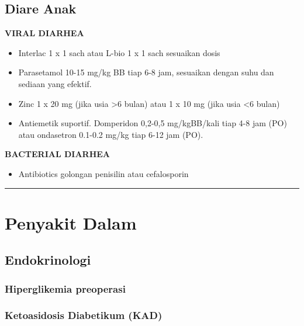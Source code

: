 \documentclass[
]{book}
\providecommand{\tightlist}{%
  \setlength{\itemsep}{0pt}\setlength{\parskip}{0pt}}
\begin{document}
\hypertarget{diare-anak}{%
\subsection{Diare Anak}\label{diare-anak}}

\textbf{VIRAL DIARHEA}

\begin{itemize}
\tightlist
\item
  Interlac 1 x 1 sach atau L-bio 1 x 1 sach sesuaikan dosis
\item
  Parasetamol 10-15 mg/kg BB tiap 6-8 jam, sesuaikan dengan suhu dan sediaan yang efektif.
\item
  Zinc 1 x 20 mg (jika usia \textgreater6 bulan) atau 1 x 10 mg (jika usia \textless6 bulan)
\item
  Antiemetik suportif. Domperidon 0,2-0,5 mg/kgBB/kali tiap 4-8 jam (PO) atau ondasetron 0.1-0.2 mg/kg tiap 6-12 jam (PO).
\end{itemize}

\textbf{BACTERIAL DIARHEA}

\begin{itemize}
\tightlist
\item
  Antibiotics golongan penisilin atau cefalosporin
\end{itemize}

\begin{center}\rule{0.5\linewidth}{0.5pt}\end{center}

\hypertarget{penyakit-dalam-1}{%
\section{Penyakit Dalam}\label{penyakit-dalam-1}}

\hypertarget{endokrinologi}{%
\subsection{Endokrinologi}\label{endokrinologi}}

\hypertarget{hiperglikemia-preoperasi}{%
\subsubsection{Hiperglikemia preoperasi}\label{hiperglikemia-preoperasi}}

\hypertarget{ketoasidosis-diabetikum-kad}{%
\subsubsection{Ketoasidosis Diabetikum (KAD)}\label{ketoasidosis-diabetikum-kad}}
\end{document}
